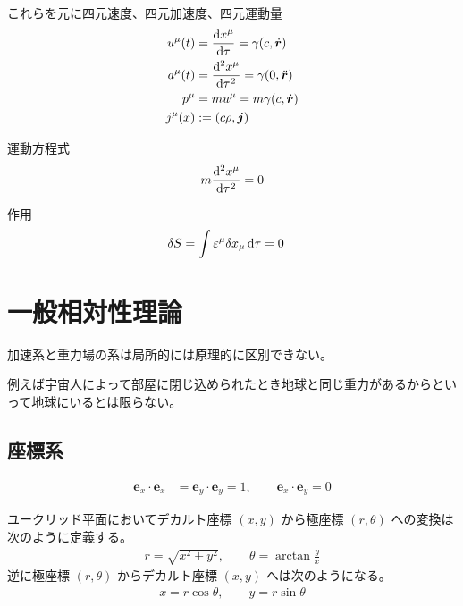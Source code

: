 \documentclass[uplatex,dvipdfmx,a4paper,11pt]{jlreq}
\newcommand{\ee}{\bm{e}}
\newcommand{\rr}{\bm{r}}
\theoremstyle{definition}
\begin{document}
これらを元に四元速度、四元加速度、四元運動量
\begin{align}
  u^\mu(t) & = \diff{x^\mu}{\tau} = \gamma(c, \dot{\rr})     \\
  a^\mu(t) & = \diff[2]{x^\mu}{\tau} = \gamma(0, \ddot{\rr}) \\
  p^\mu    & = mu^\mu = m\gamma(c, \dot{\rr})                \\
  j^\mu(x) & := (c\rho, \bm{j})
\end{align}

運動方程式
\begin{align}
  m\diff[2]{x^\mu}{\tau} = 0
\end{align}

作用
\begin{align}
  \delta S & = \int \varepsilon^\mu\delta x_\mu\dl{\tau} = 0
\end{align}

\section{一般相対性理論}
\begin{axiom}[アインシュタインの等価原理]
  加速系と重力場の系は局所的には原理的に区別できない。
\end{axiom}
例えば宇宙人によって部屋に閉じ込められたとき地球と同じ重力があるからといって地球にいるとは限らない。

\subsection{座標系}
\begin{definition}[デカルト座標]
  \begin{align}
    \ee_x\cdot\ee_x & = \ee_y\cdot\ee_y = 1, \qquad \ee_x\cdot\ee_y = 0
  \end{align}
\end{definition}

\begin{definition}[極座標]
  ユークリッド平面においてデカルト座標 $(x, y)$ から極座標 $(r, \theta)$ への変換は次のように定義する。
  \begin{align}
    r = \sqrt{x^2 + y^2}, \qquad \theta = \arctan\frac{y}{x}
  \end{align}
  逆に極座標 $(r, \theta)$ からデカルト座標 $(x, y)$ へは次のようになる。
  \begin{align}
    x = r\cos\theta, \qquad y = r\sin\theta
  \end{align}
\end{definition}
\end{document}
